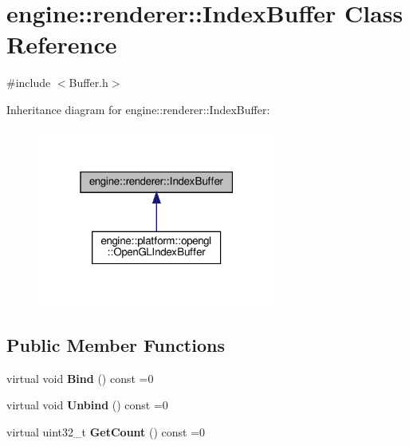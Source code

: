 \hypertarget{classengine_1_1renderer_1_1IndexBuffer}{}\section{engine\+:\+:renderer\+:\+:Index\+Buffer Class Reference}
\label{classengine_1_1renderer_1_1IndexBuffer}


{\ttfamily \#include $<$Buffer.\+h$>$}



Inheritance diagram for engine\+:\+:renderer\+:\+:Index\+Buffer\+:\nopagebreak
\begin{figure}[H]
\begin{center}
\leavevmode
\includegraphics[width=223pt]{classengine_1_1renderer_1_1IndexBuffer__inherit__graph}
\end{center}
\end{figure}
\subsection*{Public Member Functions}
\begin{DoxyCompactItemize}
\item 
\mbox{\label{classengine_1_1renderer_1_1IndexBuffer_a7c52dbc4b44f40576d5ea779adab9ff1}} 
virtual void {\bfseries Bind} () const =0
\item 
\mbox{\label{classengine_1_1renderer_1_1IndexBuffer_a34fa5a15f323617a82ffc1641312b214}} 
virtual void {\bfseries Unbind} () const =0
\item 
\mbox{\label{classengine_1_1renderer_1_1IndexBuffer_a231d15b46a8b932b3a03b6be95256bac}} 
virtual uint32\+\_\+t {\bfseries Get\+Count} () const =0
\end{DoxyCompactItemize}
